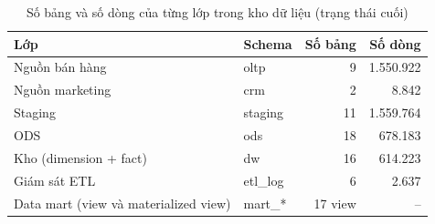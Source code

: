 \begin{table}[htbp]
\centering\small
\caption{Số bảng và số dòng của từng lớp trong kho dữ liệu (trạng thái cuối)}
\label{tab:layers}
\begin{tabular}{llrr}
\toprule
\textbf{Lớp} & \textbf{Schema} & \textbf{Số bảng} & \textbf{Số dòng} \\
\midrule
Nguồn bán hàng & oltp & 9 & 1.550.922 \\
Nguồn marketing & crm & 2 & 8.842 \\
Staging & staging & 11 & 1.559.764 \\
ODS & ods & 18 & 678.183 \\
Kho (dimension + fact) & dw & 16 & 614.223 \\
Giám sát ETL & etl\_log & 6 & 2.637 \\
Data mart (view và materialized view) & mart\_* & 17 view & -- \\
\bottomrule
\end{tabular}
\end{table}
